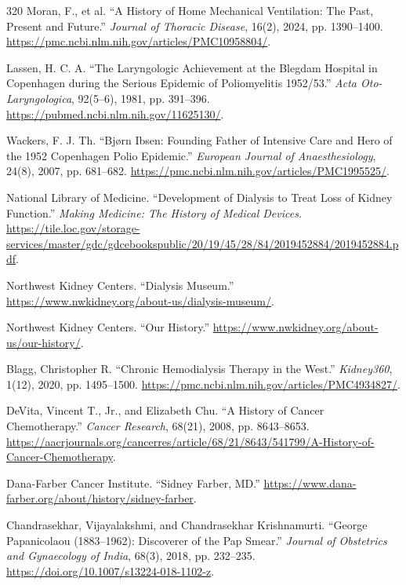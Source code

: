 \documentclass[12pt,oneside]{book}
\begin{document}
\begin{thebibliography}{320}
Moran, F., et al. ``A History of Home Mechanical Ventilation: The Past,
Present and Future.'' \emph{Journal of Thoracic Disease}, 16(2), 2024,
pp. 1390--1400. \url{https://pmc.ncbi.nlm.nih.gov/articles/PMC10958804/}.

Lassen, H. C. A. ``The Laryngologic Achievement at the Blegdam Hospital in
Copenhagen during the Serious Epidemic of Poliomyelitis 1952/53.''
\emph{Acta Oto-Laryngologica}, 92(5--6), 1981, pp. 391--396.
\url{https://pubmed.ncbi.nlm.nih.gov/11625130/}.

Wackers, F. J. Th. ``Bjørn Ibsen: Founding Father of Intensive Care and Hero
of the 1952 Copenhagen Polio Epidemic.'' \emph{European Journal of
Anaesthesiology}, 24(8), 2007, pp. 681--682.
\url{https://pmc.ncbi.nlm.nih.gov/articles/PMC1995525/}.

National Library of Medicine. ``Development of Dialysis to Treat Loss of
Kidney Function.'' \emph{Making Medicine: The History of Medical Devices.}
\url{https://tile.loc.gov/storage-services/master/gdc/gdcebookspublic/20/19/45/28/84/2019452884/2019452884.pdf}.

Northwest Kidney Centers. ``Dialysis Museum.''
\url{https://www.nwkidney.org/about-us/dialysis-museum/}.

Northwest Kidney Centers. ``Our History.''
\url{https://www.nwkidney.org/about-us/our-history/}.

Blagg, Christopher R. ``Chronic Hemodialysis Therapy in the West.''
\emph{Kidney360}, 1(12), 2020, pp. 1495--1500.
\url{https://pmc.ncbi.nlm.nih.gov/articles/PMC4934827/}.

DeVita, Vincent T., Jr., and Elizabeth Chu. ``A History of Cancer
Chemotherapy.'' \emph{Cancer Research}, 68(21), 2008, pp. 8643--8653.
\url{https://aacrjournals.org/cancerres/article/68/21/8643/541799/A-History-of-Cancer-Chemotherapy}.

Dana-Farber Cancer Institute. ``Sidney Farber, MD.''
\url{https://www.dana-farber.org/about/history/sidney-farber}.

Chandrasekhar, Vijayalakshmi, and Chandrasekhar Krishnamurti. ``George
Papanicolaou (1883--1962): Discoverer of the Pap Smear.'' \emph{Journal of
Obstetrics and Gynaecology of India}, 68(3), 2018, pp. 232--235.
\url{https://doi.org/10.1007/s13224-018-1102-z}.


\end{thebibliography}
\end{document}
